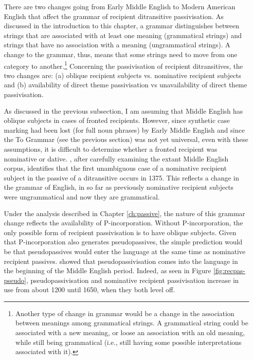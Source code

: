 	There are two changes going from Early Middle English to Modern American English that affect the grammar of recipient ditransitive passivisation. As discussed in the introduction to this chapter, a grammar distinguishes between strings that are associated with at least one meaning (grammatical strings) and strings that have no association with a meaning (ungrammatical strings). A change to the grammar, thus, means that some strings need to move from one category to another.\footnote{Another type of change in grammar would be a change in the association between meanings among grammatical strings. A grammatical string could be associated with a new meaning, or loose an association with an old meaning, while still being grammatical (i.e., still having some possible interpretations associated with it).} Concerning the passivisation of recipient ditransitives, the two changes are: (a) oblique recipient subjects vs. nominative recipient subjects and (b) availability of direct theme passivisation vs unavailability of direct theme passivisation. 

	As discussed in the previous subsection, I am assuming that Middle English has oblique subjects in cases of fronted recipients. However, since synthetic case marking had been lost (for full noun phrases) by Early Middle English and since the To Grammar (see the previous section) was not yet universal, even with these assumptions, it is difficult to determine whether a fronted recipient was nominative or dative. \cite{Allen.1999}, after carefully examining the extant Middle English corpus, identifies that the first unambiguous case of a nominative recipient subject in the passive of a ditransitive occurs in 1375. This reflects a change in the grammar of English, in so far as previously nominative recipient subjects were ungrammatical and now they are grammatical.

	Under the analysis described in Chapter \ref{ch:passive}, the nature of this grammar change reflects the availability of P-incorporation. Without P-incorporation, the only possible form of recipient passivisation is to have oblique subjects. Given that P-incorporation also generates pseudopassives, the simple prediction would be that pseudopassives would enter the language at the same time as nominative recipient passives. \cite{Sigursson.2014} showed that pseudopassivisation comes into the language in the beginning of the Middle English period. Indeed, as seen in Figure \ref{fig:recpas-pseudo}, pseudopassivisation and nominative recipient passivisation increase in use from about 1200 until 1650, when they both level off.

